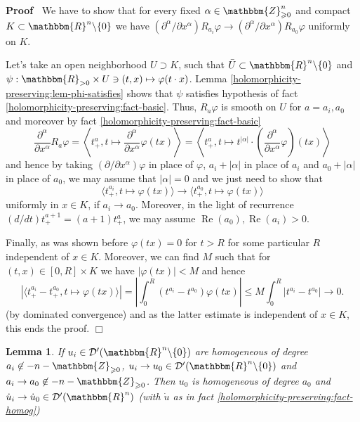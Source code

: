 \documentclass{article}
\newcommand{\nin}{\not\in}
\newcommand{\tmop}[1]{\ensuremath{\operatorname{#1}}}
\renewenvironment{proof}{\noindent\textbf{Proof\ }}{\hspace*{\fill}$\Box$\medskip}
\newtheorem{lemma}[proposition]{Lemma}
\theoremstyle{remark}
\begin{document}
\begin{proof}
  We have to show that for every fixed $\alpha \in \mathbbm{Z}_{\geqslant
  0}^n$ and compact $K \subset \mathbbm{R}^n \backslash \{ 0 \}$ we have
  $(\partial^{\alpha} / \partial x^{\alpha}) R_{a_i} \varphi \rightarrow
  (\partial^{\alpha} / \partial x^{\alpha}) R_{a_0} \varphi$ uniformly on $K$.
  
  Let's take an open neighborhood $U \supset K$, such that $\bar{U} \subset
  \mathbbm{R}^n \backslash \{ 0 \}$ and $\psi : \mathbbm{R}_{> 0} \times U \ni
  (t, x) \mapsto \varphi (t \cdot x)$. Lemma
  \ref{holomorphicity-preserving:lem-phi-satisfies} shows that $\psi$
  satisfies hypothesis of fact \ref{holomorphicity-preserving:fact-basic}.
  Thus, $R_a \varphi$ is smooth on $U$ for $a = a_i, a_0$ and moreover by fact
  \ref{holomorphicity-preserving:fact-basic}
  \[ \frac{\partial^{\alpha}}{\partial x^{\alpha}} R_a \varphi = \left\langle
     t_+^{a}, t \mapsto \frac{\partial^{\alpha}}{\partial x^{\alpha}}
     \varphi (t x) \right\rangle = \left\langle t_+^{a}, t \mapsto t^{|
     \alpha |} \cdot \left( \frac{\partial^{\alpha}}{\partial x^{\alpha}}
     \varphi \right) (t x) \right\rangle \]
  and hence by taking $(\partial / \partial x^{\alpha}) \varphi$ in place of
  $\varphi$, $a_i + | \alpha |$ in place of $a_i$ and $a_0 + | \alpha |$ in
  place of $a_0$, we may assume that $| \alpha | = 0$ and we just need to show
  that
  \[ \langle t_+^{a_i}, t \mapsto \varphi (t x) \rangle \rightarrow \langle
     t_+^{a_0}, t \mapsto \varphi (t x) \rangle \]
  uniformly in $x \in K$, if $a_i \rightarrow a_0$. Moreover, in the light of
  recurrence $(d / d t) t_+^{a + 1} = (a + 1) t_+^a$, we may assume $\tmop{Re}
  (a_0), \tmop{Re} (a_i) > 0$.
  
  Finally, as was shown before $\varphi (t x) = 0$ for $t > R$ for some
  particular $R$ independent of $x \in K$. Moreover, we can find $M$ such that
  for $(t, x) \in [0, R] \times K$ we have $| \varphi (t x) | < M$ and hence
  \[ | \langle t_+^{a_i} - t_+^{a_0}, t \mapsto \varphi (t x) \rangle | =
     \left| \int_0^R (t^{a_i} - t^{a_0}) \varphi (t x) \right| \leqslant M
     \int_0^R | t^{a_i} - t^{a_0} | \rightarrow 0. \]
  (by dominated convergence) and as the latter estimate is independent of $x
  \in K$, this ends the proof.
\end{proof}

\begin{lemma}
  \label{holomorphicity-preserving:lem-homog-ctt}If $u_i \in \mathcal{D}'
  (\mathbbm{R}^n \backslash \{ 0 \})$ are homogeneous of degree $a_i \nin - n
  -\mathbbm{Z}_{\geqslant 0}$, $u_i \rightarrow u_0 \in \mathcal{D}'
  (\mathbbm{R}^n \backslash \{ 0 \})$ and $a_i \rightarrow a_0 \nin - n
  -\mathbbm{Z}_{\geqslant 0}$. Then $u_0$ is homogeneous of degree $a_0$ and
  $\dot{u}_i \rightarrow \dot{u}_0 \in \mathcal{D}' (\mathbbm{R}^n)$
  (with $\dot{u}$ as in fact \ref{holomorphicity-preserving:fact-homog})
\end{lemma}
\end{document}
